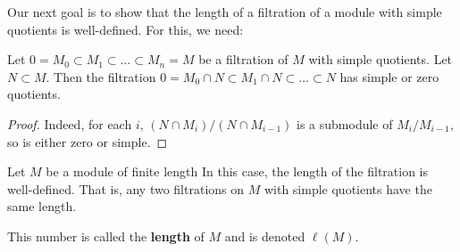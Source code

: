 Our next goal is to show that the length of a filtration of a module with
simple quotients is well-defined.
For this, we need:
\begin{lemma}  \label{simplefiltrationint}
Let $0 = M_0 \subset M_1 \subset \dots \subset M_n = M$ be  a filtration of
$M$ with simple quotients. Let $N \subset M$. Then the filtration
$0 = M_0 \cap N \subset M_1 \cap N \subset \dots \subset N$ has simple or zero
quotients. 
\end{lemma} 
\begin{proof} 
Indeed, for each $i$, $(N \cap M_i)/(N \cap M_{i-1})$ is a submodule of
$M_i / M_{i-1}$, so is either zero or simple.
\end{proof} 


\begin{proposition}\label{lengthexists} Let $M$ be a module of finite length
In this case, the length of the filtration is well-defined. That is, any two filtrations
on $M$ with simple quotients have the same length.
\end{proposition} 
\begin{definition} 
This number is called the \textbf{length} of $M$ and is denoted $\ell(M)$.
\end{definition} 
